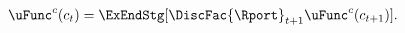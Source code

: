   \begin{equation}\begin{gathered}\begin{aligned}
        \uFunc^{c}(c_{t})  & = \ExEndStg[\DiscFac {\Rport}_{t+1} \uFunc^{c}(c_{t+1})]. \label{eq:EulercRiskyR}
      \end{aligned}\end{gathered}\end{equation}
